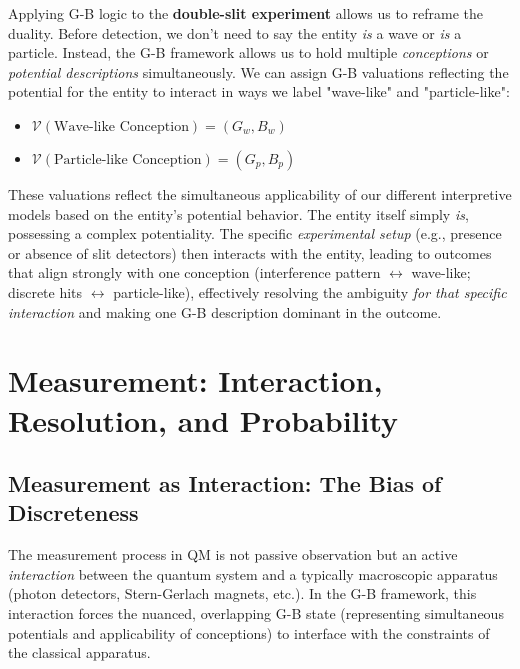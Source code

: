 \documentclass{article}
\begin{document}
Applying G-B logic to the \textbf{double-slit experiment} allows us to reframe the duality. Before detection, we don't need to say the entity \textit{is} a wave or \textit{is} a particle. Instead, the G-B framework allows us to hold multiple \textit{conceptions} or \textit{potential descriptions} simultaneously. We can assign G-B valuations reflecting the potential for the entity to interact in ways we label "wave-like" and "particle-like":
\begin{itemize}
    \item $\mathcal{V}(\text{Wave-like Conception}) = (G_w, B_w)$
    \item $\mathcal{V}(\text{Particle-like Conception}) = (G_p, B_p)$
\end{itemize}
These valuations reflect the simultaneous applicability of our different interpretive models based on the entity's potential behavior. The entity itself simply \textit{is}, possessing a complex potentiality. The specific \textit{experimental setup} (e.g., presence or absence of slit detectors) then interacts with the entity, leading to outcomes that align strongly with one conception (interference pattern $\leftrightarrow$ wave-like; discrete hits $\leftrightarrow$ particle-like), effectively resolving the ambiguity \textit{for that specific interaction} and making one G-B description dominant in the outcome.

\section{Measurement: Interaction, Resolution, and Probability}

\subsection{Measurement as Interaction: The Bias of Discreteness}

The measurement process in QM is not passive observation but an active \textit{interaction} between the quantum system and a typically macroscopic apparatus (photon detectors, Stern-Gerlach magnets, etc.). In the G-B framework, this interaction forces the nuanced, overlapping G-B state (representing simultaneous potentials and applicability of conceptions) to interface with the constraints of the classical apparatus.
\end{document}
